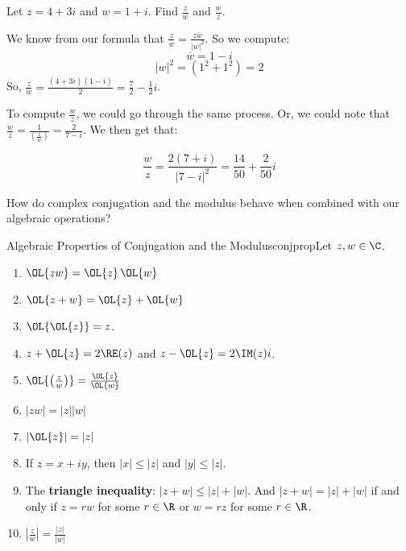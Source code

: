 \begin{ex}{}{} Let $z = 4 + 3i$ and $w = 1 + i$. Find $\frac{z}{w}$ and $\frac{w}{z}$.

We know from our formula that $\frac{z}{w} = \frac{z\overline{w}}{|w|^2}$. So we compute:
$$\overline{w} = 1 - i$$
$$|w|^2 = (1^2 + 1^2)  = 2$$
So, $\frac{z}{w} = \frac{(4 + 3i)(1 - i)}{2} = \frac{7}{2} -\frac{1}{2}i$.


To compute $\frac{w}{z}$, we could go through the same process. Or, we could note that $\frac{w}{z} = \frac{1}{\left(\frac{z}{w}\right)} = \frac{2}{7 - i}$. We then get that:

$$\frac{w}{z} = \frac{2(7+i)}{|7-i|^2} = \frac{14}{50} + \frac{2}{50}i$$

\end{ex}

How do complex conjugation and the modulus behave when combined with our algebraic operations?

\begin{thmbo}{Algebraic Properties of Conjugation and the Modulus}{conjprop}Let $z,w \in \C$.

\begin{enumerate}
\item $\OL{zw} = \OL{z}\,\OL{w}$
\item $\OL{z + w} = \OL{z} + \OL{w}$
\item $\OL{\OL{z}} = z$.
\item $z + \OL{z} = 2\RE(z)$ and $z - \OL{z} = 2\IM(z)i$.
\item $\OL{\left(\frac{z}{w}\right)} = \frac{\OL{z}}{\OL{w}}$
\item $|zw| = |z||w|$
\item $|\OL{z}| = |z|$
\item If $z = x + iy$, then $|x| \le |z|$ and $|y| \le |z|$.
\item The {\bf triangle inequality}: $|z + w| \le |z| + |w|$. And $|z + w| = |z| + |w|$ if and only if $z = rw$ for some $r\in \R$ or $w = rz$ for some $r\in \R$.
\item $\left|\frac{z}{w}\right| = \frac{|z|}{|w|}$
\end{enumerate}

\end{thmbo}

